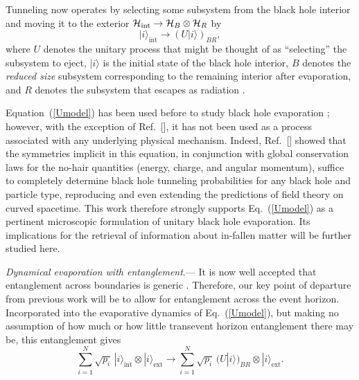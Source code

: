 \documentclass[aps,showpacs,prl,12pt]{revtex4}
\begin{document}
Tunneling now operates \cite{B10} by selecting some subsystem from
the black hole interior and moving it to the exterior
${\cal H}_{\text{int}}\rightarrow{\cal H}_B\otimes {\cal H}_R$ by
\begin{equation}
|i\rangle_{\text{int}}\rightarrow (U|i\rangle)_{BR}, \label{Umodel}
\end{equation}
where $U$ denotes the unitary process that might be thought of as
``selecting'' the subsystem to eject, $|i\rangle$ is the initial
state of the black hole interior, $B$ denotes the {\it reduced size\/}
subsystem corresponding to the remaining interior after evaporation,
and $R$ denotes the subsystem that escapes as
radiation \cite{B10,Page93,Hayden07}.

Equation~(\ref{Umodel}) has been used before to study black hole
evaporation \cite{B10,Page93,Hayden07}; however, with the exception
of Ref.~[], it has not been used as a process
associated with any
underlying physical mechanism. Indeed, Ref.~[] showed that
the symmetries implicit in this equation, in conjunction with global 
conservation laws for the no-hair quantities (energy, charge, and 
angular momentum), suffice to completely determine black hole tunneling 
probabilities for any black hole and particle type, reproducing and 
even extending the predictions of field theory on curved spacetime. 
This work therefore strongly supports Eq.~(\ref{Umodel}) as a pertinent
microscopic formulation of unitary black hole evaporation. Its
implications for the retrieval of information about in-fallen
matter will be further studied here.

{\it Dynamical evaporation with entanglement}.---%
It is now well accepted that entanglement across boundaries is
generic \cite{Eisert09}. Therefore, our key point of departure from
previous work \cite{B10,Page93,Hayden07,Smolin,me} will be to allow for
entanglement across the event horizon. Incorporated into the evaporative
dynamics of Eq.~(\ref{Umodel}), but making no assumption of how much or
how little transevent horizon entanglement there may be, this
entanglement gives
\begin{equation}
\sum_{i=1}^N\sqrt{p_i}\, |i\rangle_{\text{int}}\otimes|i\rangle_{\text{ext}}
\rightarrow \sum_{i=1}^N \sqrt{p_i}\, (U|i\rangle)_{{BR}}\otimes
|i\rangle_{\text{ext}}.
\label{entUmodel}
\end{equation}
\end{document}
